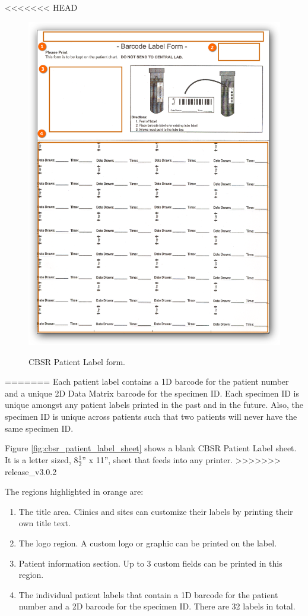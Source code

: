 <<<<<<< HEAD
    \begin{figure}[H]
      \centering
      \scalebox{0.35}
      { \includegraphics*{screenshots/printer_labels/01_cbsr_patient_label_sheet} }
      \caption{CBSR Patient Label form.}
      \label{fig:cbsr_patient_label}
    \end{figure}
=======
Each patient label contains a 1D barcode for the patient number and a unique 2D
Data Matrix barcode for the specimen ID. Each specimen ID is unique amongst any
patient labels printed in the past and in the future. Also, the specimen ID is
unique across patients such that two patients will never have the same specimen
ID.

Figure \ref{fig:cbsr_patient_label_sheet} shows a blank CBSR Patient Label
sheet. It is a letter sized, 8$\frac{1}{2}$'' x 11'', sheet that
feeds into any printer.
>>>>>>> release_v3.0.2

The regions highlighted in orange are:
\begin{enumerate}
  \item The title area. Clinics and sites can customize their labels by
    printing their own title text.
  \item The logo region. A custom logo or graphic can be printed on the label.
  \item Patient information section. Up to 3 custom fields can be printed in
    this region.
  \item The individual patient labels that contain a 1D barcode for the patient
    number and a 2D barcode for the specimen ID. There are 32 labels in total.
\end{enumerate}


